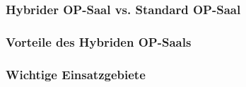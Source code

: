 \chapter{}
\label{sec:overview}

\subsection{Hybrider OP-Saal vs. Standard OP-Saal}
\subsection{Vorteile des Hybriden OP-Saals}
\subsection{Wichtige Einsatzgebiete}